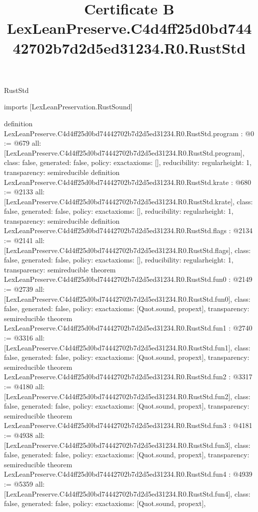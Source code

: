 \begin{lexlean}{RustStd}
\title{Certificate B LexLeanPreserve.C4d4ff25d0bd74442702b7d2d5ed31234.R0.RustStd}
\begin{coremodule}
imports [LexLeanPreservation.RustSound]

definition LexLeanPreserve.C4d4ff25d0bd74442702b7d2d5ed31234.R0.RustStd.program : @0 := @679 {
  all: [LexLeanPreserve.C4d4ff25d0bd74442702b7d2d5ed31234.R0.RustStd.program],
  class: false,
  generated: false,
  policy: exact{axioms: []},
  reducibility: regular{height: 1},
  transparency: semireducible
}
definition LexLeanPreserve.C4d4ff25d0bd74442702b7d2d5ed31234.R0.RustStd.krate : @680 := @2133 {
  all: [LexLeanPreserve.C4d4ff25d0bd74442702b7d2d5ed31234.R0.RustStd.krate],
  class: false,
  generated: false,
  policy: exact{axioms: []},
  reducibility: regular{height: 1},
  transparency: semireducible
}
definition LexLeanPreserve.C4d4ff25d0bd74442702b7d2d5ed31234.R0.RustStd.flags : @2134 := @2141 {
  all: [LexLeanPreserve.C4d4ff25d0bd74442702b7d2d5ed31234.R0.RustStd.flags],
  class: false,
  generated: false,
  policy: exact{axioms: []},
  reducibility: regular{height: 1},
  transparency: semireducible
}
theorem LexLeanPreserve.C4d4ff25d0bd74442702b7d2d5ed31234.R0.RustStd.fun0 : @2149 := @2739 {
  all: [LexLeanPreserve.C4d4ff25d0bd74442702b7d2d5ed31234.R0.RustStd.fun0],
  class: false,
  generated: false,
  policy: exact{axioms: [Quot.sound, propext]},
  transparency: semireducible
}
theorem LexLeanPreserve.C4d4ff25d0bd74442702b7d2d5ed31234.R0.RustStd.fun1 : @2740 := @3316 {
  all: [LexLeanPreserve.C4d4ff25d0bd74442702b7d2d5ed31234.R0.RustStd.fun1],
  class: false,
  generated: false,
  policy: exact{axioms: [Quot.sound, propext]},
  transparency: semireducible
}
theorem LexLeanPreserve.C4d4ff25d0bd74442702b7d2d5ed31234.R0.RustStd.fun2 : @3317 := @4180 {
  all: [LexLeanPreserve.C4d4ff25d0bd74442702b7d2d5ed31234.R0.RustStd.fun2],
  class: false,
  generated: false,
  policy: exact{axioms: [Quot.sound, propext]},
  transparency: semireducible
}
theorem LexLeanPreserve.C4d4ff25d0bd74442702b7d2d5ed31234.R0.RustStd.fun3 : @4181 := @4938 {
  all: [LexLeanPreserve.C4d4ff25d0bd74442702b7d2d5ed31234.R0.RustStd.fun3],
  class: false,
  generated: false,
  policy: exact{axioms: [Quot.sound, propext]},
  transparency: semireducible
}
theorem LexLeanPreserve.C4d4ff25d0bd74442702b7d2d5ed31234.R0.RustStd.fun4 : @4939 := @5359 {
  all: [LexLeanPreserve.C4d4ff25d0bd74442702b7d2d5ed31234.R0.RustStd.fun4],
  class: false,
  generated: false,
  policy: exact{axioms: [Quot.sound, propext]},
}
\end{coremodule}
\end{lexlean}
